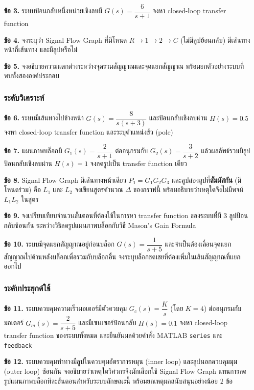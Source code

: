 \textbf{ข้อ 3.} ระบบป้อนกลับหนึ่งหน่วยเชิงลบมี $G(s)=\dfrac{6}{s+1}$ จงหา closed-loop transfer function

\textbf{ข้อ 4.} จงระบุว่า Signal Flow Graph ที่มีโหนด $R \to 1 \to 2 \to C$ (ไม่มีลูปย้อนกลับ) มีเส้นทางหน้ากี่เส้นทาง และมีลูปหรือไม่

\textbf{ข้อ 5.} จงอธิบายความแตกต่างระหว่างจุดรวมสัญญาณและจุดแยกสัญญาณ พร้อมยกตัวอย่างระบบที่พบทั้งสององค์ประกอบ

\subsubsection{ระดับวิเคราะห์}

\textbf{ข้อ 6.} ระบบมีเส้นทางไปข้างหน้า $G(s)=\dfrac{8}{s(s+3)}$ และป้อนกลับเชิงลบผ่าน $H(s)=0.5$ จงหา closed-loop transfer function และระบุตำแหน่งขั้ว (pole)

\textbf{ข้อ 7.} แผนภาพบล็อกมี $G_1(s)=\dfrac{2}{s+1}$ ต่ออนุกรมกับ $G_2(s)=\dfrac{3}{s+2}$ แล้วผลลัพธ์รวมมีลูปป้อนกลับเชิงลบผ่าน $H(s)=1$ จงลดรูปเป็น transfer function เดียว

\textbf{ข้อ 8.} Signal Flow Graph มีเส้นทางหน้าเดียว $P_1 = G_1G_2G_3$ และลูปสองลูปที่\textbf{สัมผัสกัน} (มีโหนดร่วม) คือ $L_1$ และ $L_2$ จงเขียนสูตรคำนวณ $\Delta$ ของกราฟนี้ พร้อมอธิบายว่าเหตุใดจึงไม่มีพจน์ $L_1L_2$ ในสูตร

\textbf{ข้อ 9.} จงเปรียบเทียบจำนวนขั้นตอนที่ต้องใช้ในการหา transfer function ของระบบที่มี 3 ลูปป้อนกลับซ้อนกัน ระหว่างวิธีลดรูปแผนภาพบล็อกกับวิธี Mason's Gain Formula

\textbf{ข้อ 10.} ระบบมีจุดแยกสัญญาณอยู่ก่อนบล็อก $G(s)=\dfrac{1}{s+5}$ และจำเป็นต้องเลื่อนจุดแยกสัญญาณไปด้านหลังบล็อกเพื่อรวมกับบล็อกอื่น จงระบุบล็อกชดเชยที่ต้องเพิ่มในเส้นสัญญาณที่แยกออกไป

\subsubsection{ระดับประยุกต์ใช้}

\textbf{ข้อ 11.} ระบบควบคุมความเร็วมอเตอร์มีตัวควบคุม $G_c(s)=\dfrac{K}{s}$ (โดย $K=4$) ต่ออนุกรมกับมอเตอร์ $G_m(s)=\dfrac{2}{s+5}$ และมีเซนเซอร์ป้อนกลับ $H(s)=0.1$ จงหา closed-loop transfer function ของระบบทั้งหมด และยืนยันผลด้วยคำสั่ง MATLAB \texttt{series} และ \texttt{feedback}

\textbf{ข้อ 12.} ระบบควบคุมท่าทางมีลูปในควบคุมอัตราการหมุน (inner loop) และลูปนอกควบคุมมุม (outer loop) ซ้อนกัน จงอธิบายว่าเหตุใดวิศวกรจึงมักเลือกใช้ Signal Flow Graph แทนการลดรูปแผนภาพบล็อกทีละขั้นตอนสำหรับระบบลักษณะนี้ พร้อมยกเหตุผลสนับสนุนอย่างน้อย 2 ข้อ

